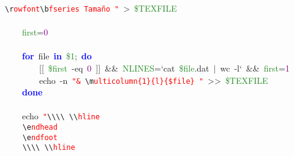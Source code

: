 \mbox{}\texttt{\textcolor{CarnationPink}{\textbackslash{}r}}\texttt{\textcolor{Red}{owfont}}\texttt{\textcolor{CarnationPink}{\textbackslash{}b}}\texttt{\textcolor{Red}{fseries\ Tamaño\ "{}}}\ \textcolor{BrickRed}{\textgreater{}}\ \textcolor{ForestGreen}{\$TEXFILE} \\
\mbox{} \\
\mbox{}\ \ \ \ \textcolor{ForestGreen}{first}\textcolor{BrickRed}{=}\textcolor{Purple}{0} \\
\mbox{} \\
\mbox{}\ \ \ \ \textbf{\textcolor{Blue}{for}}\ file\ \textbf{\textcolor{Blue}{in}}\ \textcolor{ForestGreen}{\$1}\textcolor{BrickRed}{;}\ \textbf{\textcolor{Blue}{do}} \\
\mbox{}\ \ \ \ \ \ \ \ \textcolor{BrickRed}{[[}\ \textcolor{ForestGreen}{\$first}\ -eq\ \textcolor{Purple}{0}\ \textcolor{BrickRed}{]]}\ \textcolor{BrickRed}{\&\&}\ \textcolor{ForestGreen}{NLINES}\textcolor{BrickRed}{=}`cat\ \textcolor{ForestGreen}{\$file}\textcolor{BrickRed}{.}dat\ \textcolor{BrickRed}{$|$}\ wc\ -l`\ \textcolor{BrickRed}{\&\&}\ \textcolor{ForestGreen}{first}\textcolor{BrickRed}{=}\textcolor{Purple}{1} \\
\mbox{}\ \ \ \ \ \ \ \ echo\ -n\ \texttt{\textcolor{Red}{"{}\&\ }}\texttt{\textcolor{CarnationPink}{\textbackslash{}m}}\texttt{\textcolor{Red}{ulticolumn\{1\}\{l\}\{\$file\}\ "{}}}\ \textcolor{BrickRed}{\textgreater{}\textgreater{}}\ \textcolor{ForestGreen}{\$TEXFILE} \\
\mbox{}\ \ \ \ \textbf{\textcolor{Blue}{done}} \\
\mbox{} \\
\mbox{}\ \ \ \ echo\ \texttt{\textcolor{Red}{"{}}}\texttt{\textcolor{CarnationPink}{\textbackslash{}\textbackslash{}\textbackslash{}\textbackslash{}}}\texttt{\textcolor{Red}{\ }}\texttt{\textcolor{CarnationPink}{\textbackslash{}\textbackslash{}}}\texttt{\textcolor{Red}{hline}} \\
\mbox{}\texttt{\textcolor{Red}{\ \ \ \ }}\texttt{\textcolor{CarnationPink}{\textbackslash{}e}}\texttt{\textcolor{Red}{ndhead}} \\
\mbox{}\texttt{\textcolor{Red}{\ \ \ \ }}\texttt{\textcolor{CarnationPink}{\textbackslash{}e}}\texttt{\textcolor{Red}{ndfoot}} \\
\mbox{}\texttt{\textcolor{Red}{\ \ \ \ }}\texttt{\textcolor{CarnationPink}{\textbackslash{}\textbackslash{}\textbackslash{}\textbackslash{}}}\texttt{\textcolor{Red}{\ }}\texttt{\textcolor{CarnationPink}{\textbackslash{}\textbackslash{}}}\texttt{\textcolor{Red}{hline}} \\
